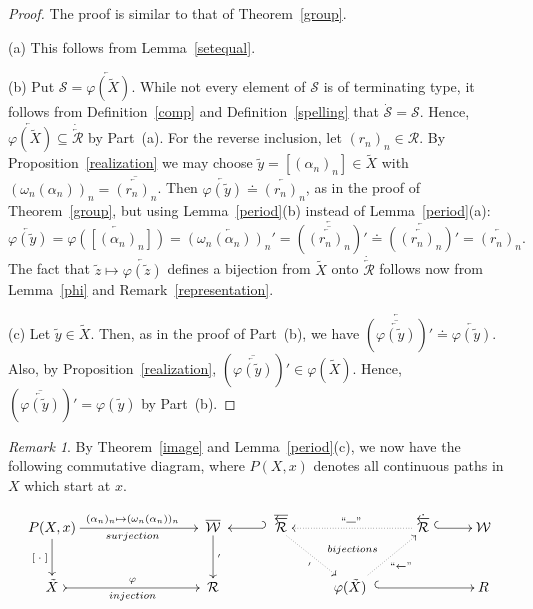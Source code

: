 \documentclass{amsart}
\theoremstyle{definition}
\theoremstyle{remark}
\newtheorem{remark}[theorem]{Remark}
\numberwithin{equation}{section}
\begin{document}
\begin{proof}
The proof is similar to that of Theorem~\ref{group}.

(a) This follows from Lemma~\ref{setequal}.

(b) Put ${\mathcal S}=\overleftarrow{\varphi(\tilde{X})}$. While not every element of $\mathcal S$ is of terminating type, it follows from Definition~\ref{comp} and Definition~\ref{spelling}  that $\dot{\mathcal S}={\mathcal S}$. Hence, $\overleftarrow{\varphi(\tilde{X})}\subseteq \dot{\overleftarrow{\mathcal R}}$ by Part~(a).  For the reverse inclusion, let $(r_n)_n\in {\mathcal R}$.
By  Proposition~\ref{realization} we may choose $\tilde{y}=[(\alpha_n)_n]\in \tilde{X}$ with
$(\omega_n(\alpha_n))_n=\overline{\overleftarrow{(r_n)_n}}$. Then $\overleftarrow{\varphi(\tilde{y})}\doteq \overleftarrow{(r_n)_n}$, as in the proof of Theorem~\ref{group}, but using  Lemma~\ref{period}(b) instead of Lemma~\ref{period}(a):
\[\overleftarrow{\varphi(\tilde{y})}=\overleftarrow{\varphi([(\alpha_n)_n])}=\overleftarrow{(\omega_n(\alpha_n))_n'}=
\overleftarrow{\left(\overline{\overleftarrow{(r_n)_n}}\right)'}\doteq \overleftarrow{\left(\overleftarrow{(r_n)_n}\right)'}=\overleftarrow{(r_n)_n}.\]
The fact that $\tilde{z}\mapsto \overleftarrow{\varphi(\tilde{z})}$ defines a bijection from $\tilde{X}$ onto $\dot{\overleftarrow{\mathcal R}}$ follows now from Lemma~\ref{phi} and Remark~\ref{representation}.

(c)
Let $\tilde{y}\in \tilde{X}$. Then, as in the proof of Part~(b), we have $\overleftarrow{\left(\overline{\overleftarrow{\varphi(\tilde{y})}}\right)'}\doteq \overleftarrow{\varphi(\tilde{y})}$. Also, by Proposition~\ref{realization}, $\left(\overline{\overleftarrow{\varphi(\tilde{y})}}\right)'\in \varphi(\tilde{X})$. Hence, $\left(\overline{\overleftarrow{\varphi(\tilde{y})}}\right)'=\varphi(\tilde{y})$ by Part~(b).
\end{proof}

\begin{remark}\label{TreeDiagram} By Theorem~\ref{image} and Lemma~\ref{period}(c), we now have the following commutative diagram, where $P(X,x)$ denotes all continuous paths in $X$  which start at $x$.

\hspace{-18pt} \parbox{8in}{
\[
\xymatrix{
P(X,x) \ar[d]_{[\;\cdot\;]}   \ar[rrr]_{surjection}^{(\alpha_n)_n\mapsto(\omega_n(\alpha_n))_n} &&&  \;\overline{\mathcal W}\;  \ar[d]^{'} & \;\; \overline{\overleftarrow{\mathcal R}} \ar@{_{(}->}[l] \ar@{.>}[dr]_{'}^{\;\;\;\;\; bijections} &&  \dot{\overleftarrow{\mathcal R}}\; \ar@{.>}_{``\overline{\;\;\;}"}[ll] \ar@{^{(}->}[r] & {\mathcal W}\\
\;\tilde{X}\; \ar@{>->}[rrr]^{\varphi}_{injection} &&& \; {\mathcal R} \;  & & \; \varphi(\tilde{X}) \;\;\ar@{^{(}->}[rr] \ar@{.>}_{``\overleftarrow{\;\;\;}"}[ur] & & R}
\]}
\end{remark}
\end{document}
